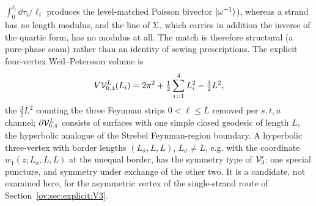 $\int_0^{\ell_i}\dd\tau_i/\ell_i$ produces the level-matched Poisson bivector
$\ket{\omega^{-1}}$), whereas a strand has \emph{no} length modulus, and the line of $\Sigma$, which carries in addition the inverse of the quartic form, has no modulus at all.
The match is therefore structural (a pure-phase seam) rather than an identity of
sewing prescriptions. The explicit four-vertex Weil--Petersson volume is
\begin{equation}
	V{\mathcal{V}}^L_{0,4}(L_i)=2\pi^2+\tfrac12\sum_{i=1}^4 L_i^2-\tfrac32 L^2,
	\label{ov:eq:VV04}
\end{equation}
the $\tfrac32 L^2$ counting the three Feynman strips $0<\ell\le L$ removed per $s,t,u$ channel;
$\partial{\mathcal{V}}^L_{0,4}$ consists of surfaces with one simple closed geodesic of length $L$,
the hyperbolic analogue of the Strebel Feynman-region boundary.
A hyperbolic three-vertex with border lengths $(L_\sigma,L,L)$, $L_\sigma\ne L$, e.g. with the coordinate $w_1(z;L_\sigma,L,L)$ at the unequal border, has the symmetry type of ${\mathcal{V}}_3'$: one special puncture, and symmetry under exchange of the other two.
It is a candidate, not examined here, for the asymmetric vertex of the single-strand route of Section~\ref{ov:sec:explicit:V3}.

